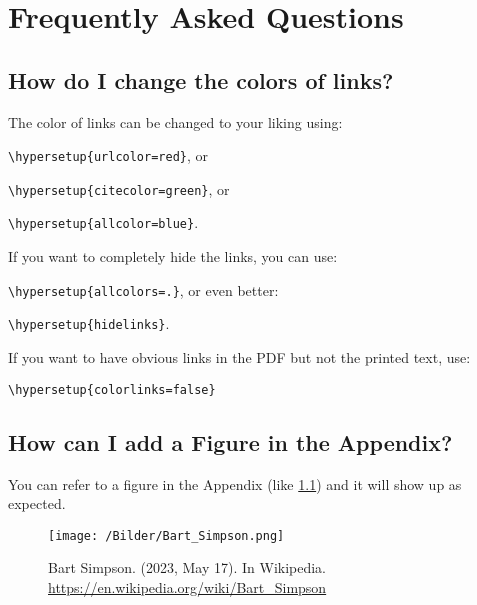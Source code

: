

\chapter{Frequently Asked Questions} %

\label{AppendixA} %

\section{How do I change the colors of links?}

The color of links can be changed to your liking using:

{\small\verb!\hypersetup{urlcolor=red}!}, or

{\small\verb!\hypersetup{citecolor=green}!}, or

{\small\verb!\hypersetup{allcolor=blue}!}.

\noindent If you want to completely hide the links, you can use:

{\small\verb!\hypersetup{allcolors=.}!}, or even better: 

{\small\verb!\hypersetup{hidelinks}!}.

\noindent If you want to have obvious links in the PDF but not the printed text, use:

{\small\verb!\hypersetup{colorlinks=false}!}

\section{How can I add a Figure in the Appendix?}

You can refer to a figure in the Appendix (like \ref{fig:appendix-figure}) and it will show up as expected.

\begin{figure}
\texttt{[image: /Bilder/Bart\_Simpson.png]}
\centering
\caption[A random appendix figure]{Bart Simpson. (2023, May 17). In Wikipedia. \url{https://en.wikipedia.org/wiki/Bart_Simpson}}
\label{fig:appendix-figure}
\end{figure}